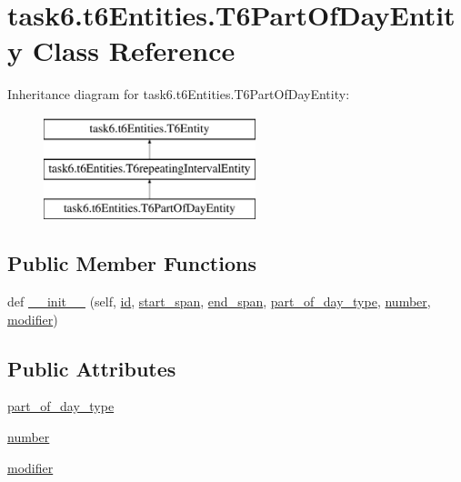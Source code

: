 \hypertarget{classtask6_1_1t6Entities_1_1T6PartOfDayEntity}{}\section{task6.\+t6\+Entities.\+T6\+Part\+Of\+Day\+Entity Class Reference}
\label{classtask6_1_1t6Entities_1_1T6PartOfDayEntity}
Inheritance diagram for task6.\+t6\+Entities.\+T6\+Part\+Of\+Day\+Entity\+:\begin{figure}[H]
\begin{center}
\leavevmode
\includegraphics[height=3.000000cm]{classtask6_1_1t6Entities_1_1T6PartOfDayEntity}
\end{center}
\end{figure}
\subsection*{Public Member Functions}
\begin{DoxyCompactItemize}
\item 
def \hyperlink{classtask6_1_1t6Entities_1_1T6PartOfDayEntity_a0ead37bbbdc71d0de29a6433728dd8ad}{\+\_\+\+\_\+init\+\_\+\+\_\+} (self, \hyperlink{classtask6_1_1t6Entities_1_1T6Entity_afeeced8134bb3ebe0cfecc64d0ab46a4}{id}, \hyperlink{classtask6_1_1t6Entities_1_1T6Entity_a52779e9af8864dc98e8b02fc5b9b041a}{start\+\_\+span}, \hyperlink{classtask6_1_1t6Entities_1_1T6Entity_aeb402200b156cd9562c5111dfe777b98}{end\+\_\+span}, \hyperlink{classtask6_1_1t6Entities_1_1T6PartOfDayEntity_a402e24a798ab8edff4fde1691dbc0804}{part\+\_\+of\+\_\+day\+\_\+type}, \hyperlink{classtask6_1_1t6Entities_1_1T6PartOfDayEntity_a79992bc771c372834736b93aedfa428f}{number}, \hyperlink{classtask6_1_1t6Entities_1_1T6PartOfDayEntity_a83c5083b560f5295d713af2fc5013748}{modifier})
\end{DoxyCompactItemize}
\subsection*{Public Attributes}
\begin{DoxyCompactItemize}
\item 
\hyperlink{classtask6_1_1t6Entities_1_1T6PartOfDayEntity_a402e24a798ab8edff4fde1691dbc0804}{part\+\_\+of\+\_\+day\+\_\+type}
\item 
\hyperlink{classtask6_1_1t6Entities_1_1T6PartOfDayEntity_a79992bc771c372834736b93aedfa428f}{number}
\item 
\hyperlink{classtask6_1_1t6Entities_1_1T6PartOfDayEntity_a83c5083b560f5295d713af2fc5013748}{modifier}
\end{DoxyCompactItemize}


